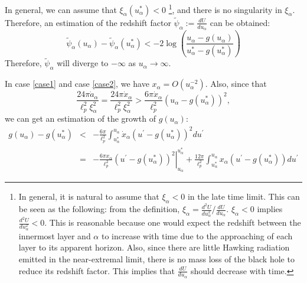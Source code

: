 \documentclass[letterpaper,12pt]{article}
\begin{document}
In general, we can assume that $\xi_{\alpha}(u_{\alpha}^{*}) < 0$ \footnote{In general, it is natural to assume that $\xi_{\alpha} < 0$ in the late time limit. This can be seen as the following: from the definition, $\xi_{\alpha} = \frac{d^{2}U}{du^{2}_{\alpha}}/\frac{dU}{du_{\alpha}}$. $\xi_{\alpha} < 0$ implies $\frac{d^{2}U}{du_{\alpha}^{2}} < 0$. This is reasonable because one would expect the redshift between the innermost layer and $\alpha$ to increase with time due to the approaching of each layer to its apparent horizon. Also, since there are little Hawking radiation emitted in the near-extremal limit, there is no mass loss of the black hole to reduce its redshift factor. This implies that $\frac{dU}{du_{\alpha}}$ should decrease with time.}, and there is no singularity in $\xi_{\alpha}$. Therefore, an estimation of the redshift factor $\tilde{\psi}_{\alpha} := \frac{dU}{du_{\alpha}}$ can be obtained:
\begin{equation}\label{eq:4-19}
\tilde{\psi}_{\alpha}(u_{\alpha})-\tilde{\psi}_{\alpha}(u_{\alpha}^{*}) < -2\log\left(\frac{u_{\alpha}-g(u_{\alpha})}{u_{\alpha}^{*}-g(u_{\alpha}^{*})}\right)
\end{equation}
Therefore, $\tilde{\psi}_{\alpha}$ will diverge to $-\infty$ as $u_{\alpha} \rightarrow \infty$. 

In case \ref{case1} and case \ref{case2}, we have $x_{\alpha} = O(u_{\alpha}^{-2})$. Also, since that 
\begin{equation}
\frac{24\pi\dot{a}_{\alpha}}{\ell_{p}^{2}\xi_{\alpha}^{2}} =\frac{24\pi\dot{x}_{\alpha}}{\ell_{p}^{2}\xi_{\alpha}^{2}}> \frac{6\pi\dot{x}_{\alpha} }{\ell_{p}^{2}}(u_{\alpha}-g(u_{\alpha}^{*}))^{2},
\end{equation}  
we can get an estimation of the growth of $g(u_{\alpha})$:
\begin{eqnarray}
g(u_{\alpha})-g(u_{\alpha}^{*}) &<& -\frac{6\pi}{\ell_{p}^{2}}\int_{u_{\alpha}^{*}}^{u_{\alpha}}\dot{x}_{\alpha}(u^{\prime}-g(u_{\alpha}^{*}))^{2}du^{\prime} \label{eq:4-17-1}\\
&=& \left.-\frac{6\pi x_{\alpha}}{\ell_{p}^{2}}(u^{\prime}-g(u_{\alpha}^{*}))^{2}
\right|_{u_{\alpha}}^{u_{\alpha}^{*}} + \frac{12\pi}{\ell_{p}^{2}}\int_{u_{\alpha}^{*}}^{u_{\alpha}}x_{\alpha}(u^{\prime}-g(u_{\alpha}^{*}))du^{\prime}\label{eq:4-17-2}
\end{eqnarray}
\end{document}
